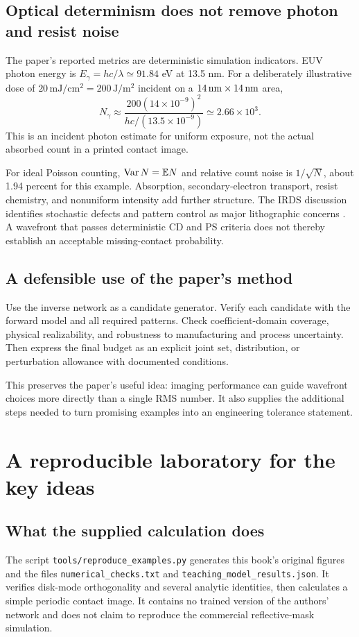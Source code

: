 \section{Optical determinism does not remove photon and resist noise}
The paper's reported metrics are deterministic simulation indicators.
EUV photon energy is $E_\gamma=hc/\lambda\simeq91.84$ eV at 13.5 nm.
For a deliberately illustrative dose of $20\,\mathrm{mJ/cm^2}
=200\,\mathrm{J/m^2}$ incident on a $14\,\mathrm{nm}\times14\,\mathrm{nm}$ area,
\[
N_\gamma\approx
\frac{200(14\times10^{-9})^2}{hc/(13.5\times10^{-9})}
\simeq2.66\times10^3.
\]
This is an incident photon estimate for uniform exposure, not the actual
absorbed count in a printed contact image.

For ideal Poisson counting, $\operatorname{Var} N=\mathbb{E} N$ and relative count noise is
$1/\sqrt N$, about 1.94 percent for this example.
Absorption, secondary-electron transport, resist chemistry, and
nonuniform intensity add further structure.
The IRDS discussion identifies stochastic defects and pattern control
as major lithographic concerns \cite{irds}.
A wavefront that passes deterministic CD and PS criteria does not
thereby establish an acceptable missing-contact probability.

\section{A defensible use of the paper's method}
Use the inverse network as a candidate generator.
Verify each candidate with the forward model and all required patterns.
Check coefficient-domain coverage, physical realizability, and robustness
to manufacturing and process uncertainty. Then express the final budget
as an explicit joint set, distribution, or perturbation allowance with
documented conditions.

This preserves the paper's useful idea: imaging performance can guide
wavefront choices more directly than a single RMS number.
It also supplies the additional steps needed to turn promising examples
into an engineering tolerance statement.

\chapter{A reproducible laboratory for the key ideas}\label{ch:lab}
\section{What the supplied calculation does}
The script \texttt{tools/reproduce\_examples.py} generates this book's
original figures and the files \texttt{numerical\_checks.txt} and
\texttt{teaching\_model\_results.json}.
It verifies disk-mode orthogonality and several analytic identities,
then calculates a simple periodic contact image.
It contains no trained version of the authors' network and does not
claim to reproduce the commercial reflective-mask simulation.

